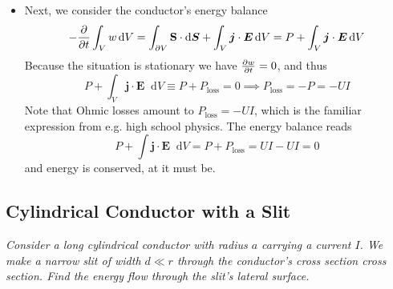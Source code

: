 \documentclass[11pt, a4paper]{article}
\newcommand{\diff}{\mathop{}\!\mathrm{d}} %
\renewcommand{\vec}[1]{\bm{#1}} %
\newcommand{\E}{\vec{E}}  %
\renewcommand{\S}{\mathbf{S}}  %
\begin{document}
\begin{itemize}
	\item Next, we consider the conductor's energy balance
	\begin{equation*}
		- \pdv{t}\int_{V}w \diff V = \int_{\partial V} \S \cdot \diff \vec{S} + \int_{V} \vec{j} \cdot \E \diff V =  P + \int_{V} \vec{j} \cdot \E \diff V
	\end{equation*}
	Because the situation is stationary we have $ \pdv{w}{t} = 0$, and thus
	\begin{equation*}
		P + \int_{V} \vec{j} \cdot \E \diff V \equiv P + P_{\text{loss}} = 0 \implies P_{\text{loss}} = -P = -UI
	\end{equation*}
	Note that Ohmic losses amount to $ P_{\text{loss}} = -UI $, which is the familiar expression from e.g. high school physics. The energy balance reads
	\begin{equation*}
		P + \int \vec{j} \cdot \E \diff V =  P + P_{\text{loss}} = UI - UI = 0
	\end{equation*}
	and energy is conserved, at it must be. 
	
	
\end{itemize}

\subsection{Cylindrical Conductor with a Slit}
\textit{Consider a long cylindrical conductor with radius $ a $ carrying a current $ I $. We make a narrow slit of width $ d \ll r $ through the conductor's cross section cross section. Find the energy flow through the slit's lateral surface.}
\end{document}
